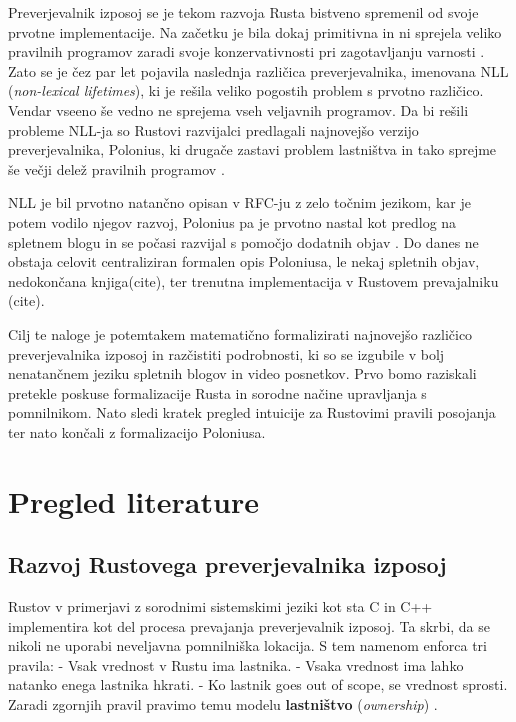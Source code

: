 \documentclass{article}
\begin{document}
Preverjevalnik izposoj se je tekom razvoja Rusta bistveno spremenil od svoje prvotne implementacije.
Na začetku je bila dokaj primitivna in ni sprejela veliko pravilnih programov zaradi svoje konzervativnosti
pri zagotavljanju varnosti \cite{2094nllRustRFC}. Zato se je čez par let pojavila naslednja različica preverjevalnika,
imenovana NLL (\textit{non-lexical lifetimes}), ki je rešila veliko pogostih problem s prvotno različico.
Vendar vseeno še vedno ne sprejema vseh veljavnih programov. Da bi rešili probleme NLL-ja so Rustovi razvijalci
predlagali najnovejšo verzijo preverjevalnika, Polonius, ki drugače zastavi problem lastništva in tako
sprejme še večji delež pravilnih programov \cite{AliasbasedFormulationBorrow}.

NLL je bil prvotno natančno opisan v RFC-ju z zelo točnim jezikom, kar je potem vodilo njegov razvoj, Polonius
pa je prvotno nastal kot predlog na spletnem blogu in se počasi razvijal s pomočjo dodatnih objav
\cite{PoloniusRevisitedParta,PoloniusRevisitedPartc,WhatPoloniusPolonius}. Do danes ne obstaja celovit centraliziran formalen opis
Poloniusa, le nekaj spletnih objav, nedokončana knjiga(cite), ter trenutna implementacija v Rustovem prevajalniku (cite).


Cilj te naloge je potemtakem matematično formalizirati najnovejšo različico preverjevalnika izposoj in razčistiti
podrobnosti, ki so se izgubile v bolj nenatančnem jeziku spletnih blogov in video posnetkov. Prvo bomo raziskali
pretekle poskuse formalizacije Rusta in sorodne načine upravljanja s pomnilnikom. Nato sledi kratek pregled
intuicije za Rustovimi pravili posojanja ter nato končali z formalizacijo Poloniusa.

\section{Pregled literature}

\subsection{Razvoj Rustovega preverjevalnika izposoj}

Rustov v primerjavi z sorodnimi sistemskimi jeziki kot sta C in C++ implementira kot del procesa prevajanja
preverjevalnik izposoj. Ta skrbi, da se nikoli ne uporabi neveljavna pomnilniška lokacija. S tem namenom
enforca tri pravila:
- Vsak vrednost v Rustu ima lastnika.
- Vsaka vrednost ima lahko natanko enega lastnika hkrati.
- Ko lastnik goes out of scope, se vrednost sprosti.
Zaradi zgornjih pravil pravimo temu modelu \textbf{lastništvo} (\textit{ownership}) \cite{klabnikRustProgrammingLanguage2023}.
\end{document}
